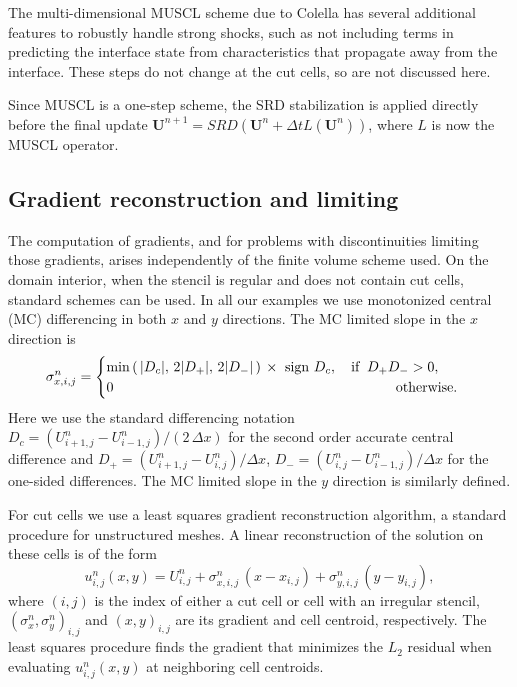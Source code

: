 The multi-dimensional MUSCL scheme due to Colella has several additional
features to robustly handle strong shocks, such as not including terms in
predicting the interface state from characteristics that propagate 
away from the interface. These
steps do not change at the cut cells, so are not discussed here.  

Since MUSCL is a one-step scheme, the SRD stabilization is applied directly
before the final update
$\mathbf{U}^{n+1} = SRD(\mathbf{U}^{n} + \Delta t
L(\mathbf{U}^{n}))$, where $L$ is now the MUSCL operator.



\subsection{Gradient reconstruction and limiting }\label{sec:limit}

The computation of gradients, and for problems with discontinuities limiting
those gradients, arises independently of the finite volume scheme used. 
On the domain interior, when the stencil is regular and does not contain cut cells, standard schemes can be used.
In all our examples we use monotonized central (MC) differencing in both $x$ and $y$ directions.  The MC limited slope in the $x$ direction is
\begin{equation}
\sigma^n_{x,i,j} =  \begin{cases} 
\min \left ( \,  \lvert{ D_c}\rvert,\,
2 \lvert {D_+}\rvert,\,
2 \lvert{D_-}\rvert \,  \right ) \,\times 
\text{ sign } D_c, \quad \text{if} \;\;  D_+ D_- >  0,\\
0 \hspace*{2.8in} \text{otherwise}.
\end{cases}
\end{equation}
Here we use the standard differencing notation
$D_c = (U^n_{i+1,j}-U^n_{i-1,j})/(2 \, \Delta x)$ for the second order accurate central difference and
$D_+ = (U^n_{i+1,j}-U^n_{i,j})/\Delta x$,
$D_- = (U^n_{i,j}-U^n_{i-1,j})/\Delta x$ for the one-sided differences.  The MC limited slope in the $y$ direction is similarly defined.

For cut cells 
we use a least squares gradient reconstruction algorithm, a standard procedure
for unstructured meshes.
A linear reconstruction of the solution on these cells is of the form
\begin{equation}
u^n_{i,j}(x,y) = U_{i,j}^n + \sigma^n_{x,i,j} \,(x-x_{i,j}) +
                     \sigma^n_{y,i,j}\,(y-y_{i,j}),
\label{eqn:lls}
\end{equation}
where $(i,j)$ is the index of either a cut cell or cell with an
irregular stencil, $(\sigma^n_{x},\sigma^n_{y})_{i,j}$ and $(x,y)_{i,j}$
are its gradient and cell centroid, respectively. The least squares
procedure finds the gradient that minimizes the $L_2$ residual when
evaluating  $u^n_{i,j}(x,y)$ at  neighboring cell centroids. 

